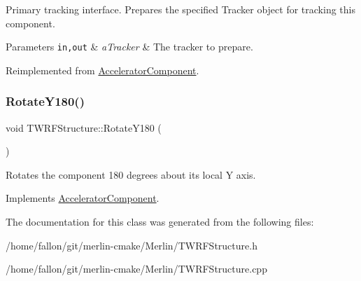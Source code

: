 Primary tracking interface. Prepares the specified Tracker object for tracking this component. 
\begin{DoxyParams}[1]{Parameters}
\mbox{\tt in,out}  & {\em a\+Tracker} & The tracker to prepare. \\
\hline
\end{DoxyParams}


Reimplemented from \hyperlink{classAcceleratorComponent_ab897c54689ac946f40c3ad0716ddd4bb}{Accelerator\+Component}.

\mbox{\label{classTWRFStructure_a04893d600099a41642de0634013c5091}} 
\subsubsection{\texorpdfstring{Rotate\+Y180()}{RotateY180()}}
{\footnotesize\ttfamily void T\+W\+R\+F\+Structure\+::\+Rotate\+Y180 (\begin{DoxyParamCaption}{ }\end{DoxyParamCaption})\hspace{0.3cm}{\ttfamily [virtual]}}

Rotates the component 180 degrees about its local Y axis. 

Implements \hyperlink{classAcceleratorComponent_a8bf0d39b56578ca99f286ca1504b9072}{Accelerator\+Component}.



The documentation for this class was generated from the following files\+:\begin{DoxyCompactItemize}
\item 
/home/fallon/git/merlin-\/cmake/\+Merlin/T\+W\+R\+F\+Structure.\+h\item 
/home/fallon/git/merlin-\/cmake/\+Merlin/T\+W\+R\+F\+Structure.\+cpp\end{DoxyCompactItemize}
